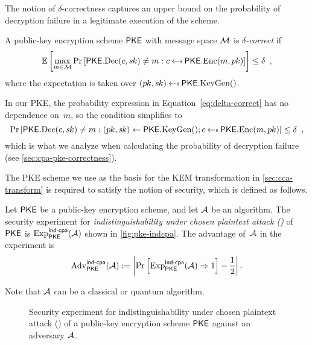 \documentclass{iacrcc}
\begin{document}
The notion of $\delta$-correctness captures an upper bound on the
probability of decryption failure in a legitimate execution of the
scheme.
\begin{definition}
  \label{def:delta-correct}
  A public-key encryption scheme $\textsf{\upshape\mdseries PKE}$ with message space $\mathcal{M}$ is
  \emph{$\delta$-correct} if
  \begin{equation}
    \label{eq:delta-correct}
    \mathbb{E}\left[ \max_{m \in \MsgSp} \Pr\left[ \PKE.\Dec(c, \sk)
        \neq m : c \getsr \PKE.\Enc(m, \pk) \right] \right] \leq
    \delta \enspace,
  \end{equation}
  where the expectation is taken over
  $(\pk, \sk) \getsr \PKE.\KeyGen()$.
\end{definition}
In our PKE, the probability expression in
Equation~\eqref{eq:delta-correct} has no dependence on~$m$, so the
condition simplifies to
\begin{equation}
  \label{eq:simpler-delta-correct}
  \Pr\left[ \PKE.\Dec(c, \sk)
    \neq m : (\pk, \sk) \gets \PKE.\KeyGen(); c \getsr \PKE.\Enc(m,
    \pk) \right]  \leq \delta \enspace ,
\end{equation}
which is what we analyze when calculating the probability of
decryption failure (see \autoref{sec:cpa-pke-correctness}).

The PKE scheme we use as the basis for the KEM transformation in
\autoref{sec:cca-transform} is required to satisfy the
notion of \INDCPA security, which is defined as follows.

\begin{definition}
  Let $\textsf{\upshape\mdseries PKE}$ be a public-key encryption scheme, and let $\mathcal{A}$
  be an algorithm.  The security experiment for
  \emph{indistinguishability under chosen plaintext attack (\INDCPA)}
  of $\textsf{\upshape\mdseries PKE}$ is $\mathrm{Exp}^{\textsf{\upshape\mdseries \textsf{\upshape\mdseries ind-cpa}}}_{\textsf{\upshape\mdseries PKE}}(\mathcal{A})$ shown in
  \autoref{fig:pke-indcpa}.  The advantage of~$\mathcal{A}$ in the
  experiment is
\[ \mathrm{Adv}^{\textsf{\upshape\mdseries \textsf{\upshape\mdseries ind-cpa}}}_{\textsf{\upshape\mdseries PKE}}(\mathcal{A}) := \left| \Pr\left[ \mathrm{Exp}^{\textsf{\upshape\mdseries \textsf{\upshape\mdseries ind-cpa}}}_{\textsf{\upshape\mdseries PKE}}(\mathcal{A}) \Rightarrow 1 \right] - \frac{1}{2} \right| . \]
\end{definition}
Note that $\mathcal{A}$ can be a classical or quantum algorithm.

\begin{figure}[h]
\centering
{}
\caption{Security experiment for indistinguishability under chosen plaintext attack (\INDCPA) of a public-key encryption scheme $\textsf{\upshape\mdseries PKE}$ against an adversary $\mathcal{A}$.}
\label{fig:pke-indcpa}
\end{figure}
\end{document}
